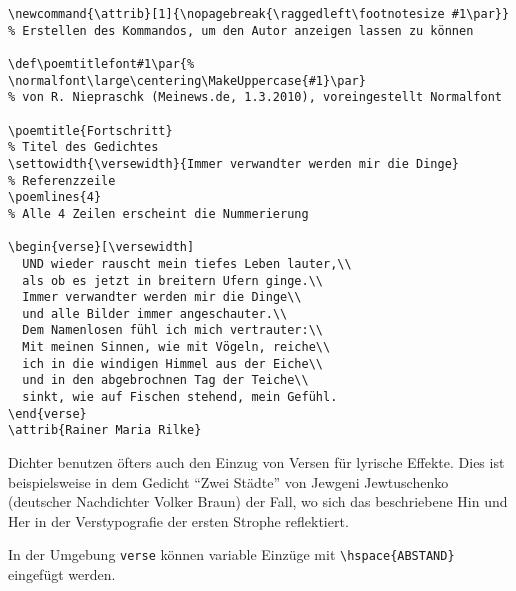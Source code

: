 \begin{lstlisting}
\newcommand{\attrib}[1]{\nopagebreak{\raggedleft\footnotesize #1\par}}
% Erstellen des Kommandos, um den Autor anzeigen lassen zu können

\def\poemtitlefont#1\par{%
\normalfont\large\centering\MakeUppercase{#1}\par}
% von R. Niepraschk (Meinews.de, 1.3.2010), voreingestellt Normalfont
	 
\poemtitle{Fortschritt}
% Titel des Gedichtes
\settowidth{\versewidth}{Immer verwandter werden mir die Dinge}
% Referenzzeile
\poemlines{4}
% Alle 4 Zeilen erscheint die Nummerierung 
 
\begin{verse}[\versewidth]
  UND wieder rauscht mein tiefes Leben lauter,\\
  als ob es jetzt in breitern Ufern ginge.\\
  Immer verwandter werden mir die Dinge\\
  und alle Bilder immer angeschauter.\\
  Dem Namenlosen fühl ich mich vertrauter:\\
  Mit meinen Sinnen, wie mit Vögeln, reiche\\
  ich in die windigen Himmel aus der Eiche\\
  und in den abgebrochnen Tag der Teiche\\
  sinkt, wie auf Fischen stehend, mein Gefühl.
\end{verse}
\attrib{Rainer Maria Rilke}
\end{lstlisting}

Dichter benutzen öfters auch den Einzug von Versen für lyrische Ef\/fekte.
Dies ist beispielsweise in dem Gedicht "`Zwei Städte"' von Jewgeni Jewtuschenko
(deutscher Nachdichter Volker Braun) der Fall, wo sich das beschriebene 
Hin und Her in der Verstypografie der ersten Strophe reflektiert. 

In der Umgebung \texttt{verse} können variable Einzüge mit 
\verb|\hspace{ABSTAND}| eingefügt werden. 
\renewcommand{\poemtitlefont}{%
\normalfont\large\itshape\centering}


 \settowidth{\versewidth}{zwischen der Stadt Ja und zwischen der Stadt Nein}

